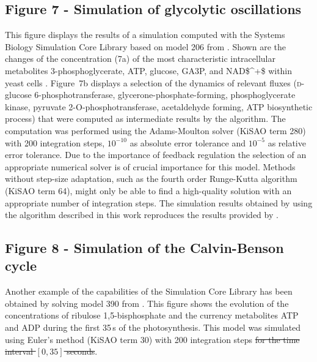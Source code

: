 \documentclass[10pt]{bmc_article}
\newenvironment{bmcformat}{\begin{raggedright}\baselineskip20pt\sloppy\setboolean{publ}{false}}{\end{raggedright}\baselineskip20pt\sloppy}
\begin{document}
\begin{bmcformat}
\subsection*{Figure 7 - Simulation of glycolytic oscillations}
This figure displays the results of a simulation computed with the Systems
Biology Simulation Core Library based on model \COR{\numero} 206 from 
\cite{Novere2006a, Wolf2000}.
Shown are the changes of the concentration (7a) of the most characteristic
intracellular metabolites 3-phosphoglycerate, \acs{ATP}, glucose, \acf{GA3P},
and \acs{NAD$^+$} within yeast cells .
Figure~7b displays a selection of the dynamics of relevant fluxes 
(\textsc{d}-glucose 6-phosphotransferase, glycerone-phosphate-forming,
phosphoglycerate kinase, pyruvate 2-O-phosphotransferase, acetaldehyde forming,
\acs{ATP} biosynthetic process)
that were computed as intermediate results by the algorithm.
The computation was performed using the Adams-Moulton solver \cite{Hairer2000}
(\acs{KiSAO} term 280) with 200 integration steps, $10^{-10}$ as absolute error
tolerance and $10^{-5}$ as relative error tolerance.
Due to the importance of feedback regulation the selection of an appropriate
numerical solver is of crucial importance for this model.
Methods without step-size adaptation, such as the fourth order Runge-Kutta
algorithm (\acs{KiSAO} term 64), might only be able to find a high-quality
solution  with an appropriate number of integration steps. 
The simulation results obtained by using the algorithm described in this work
reproduces the results provided by
.

\subsection*{Figure 8 - Simulation of the Calvin-Benson cycle}
Another example of the capabilities of the Simulation Core Library has been
obtained by solving model \COR{\numero} 390 from
\cite{Novere2006a, Arnold2011}.
This figure shows the evolution of the concentrations of ribulose 
1,5-bisphosphate
and the currency metabolites \acs{ATP} and \acs{ADP} during the first 35\,s of
the photosynthesis.
This model was simulated using Euler's method (\acs{KiSAO} term 30) with 200
integration steps\sout{ for the time interval $[0, 35]$ seconds}.



\end{bmcformat}
\end{document}
